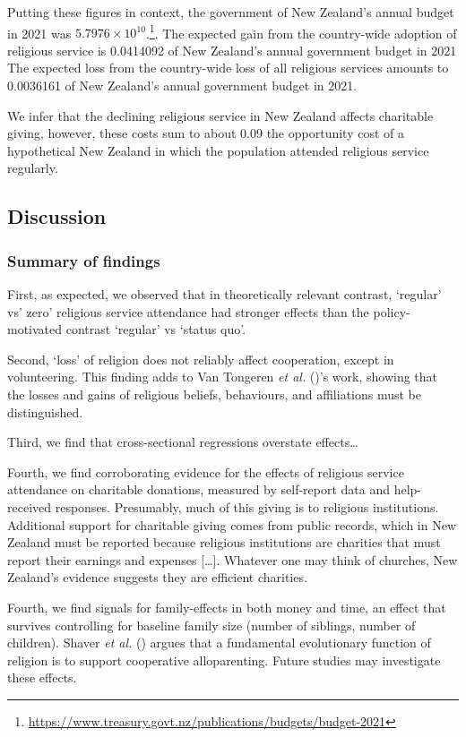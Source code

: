 \documentclass[
  single column]{article}
\begin{document}
Putting these figures in context, the government of New Zealand's annual
budget in 2021 was \ensuremath{5.7976\times 10^{10}}.\footnote{\url{https://www.treasury.govt.nz/publications/budgets/budget-2021}}.
The expected gain from the country-wide adoption of religious service is
0.0414092 of New Zealand's annual government budget in 2021 The expected
loss from the country-wide loss of all religious services amounts to
0.0036161 of New Zealand's annual government budget in 2021.

We infer that the declining religious service in New Zealand affects
charitable giving, however, these costs sum to about 0.09 the
opportunity cost of a hypothetical New Zealand in which the population
attended religious service regularly.

\subsection{Discussion}\label{discussion}

\subsubsection{Summary of findings}\label{summary-of-findings}

First, as expected, we observed that in theoretically relevant contrast,
`regular' vs' zero' religious service attendance had stronger effects
than the policy-motivated contrast `regular' vs `status quo'.

Second, `loss' of religion does not reliably affect cooperation, except
in volunteering. This finding adds to Van Tongeren \emph{et al.}
()'s work, showing that the losses
and gains of religious beliefs, behaviours, and affiliations must be
distinguished.

Third, we find that cross-sectional regressions overstate
effects\ldots{}

Fourth, we find corroborating evidence for the effects of religious
service attendance on charitable donations, measured by self-report data
and help-received responses. Presumably, much of this giving is to
religious institutions. Additional support for charitable giving comes
from public records, which in New Zealand must be reported because
religious institutions are charities that must report their earnings and
expenses {[}\ldots{]}. Whatever one may think of churches, New Zealand's
evidence suggests they are efficient charities.

Fourth, we find signals for family-effects in both money and time, an
effect that survives controlling for baseline family size (number of
siblings, number of children). Shaver \emph{et al.}
() argues that a fundamental
evolutionary function of religion is to support cooperative
alloparenting. Future studies may investigate these effects.
\end{document}
